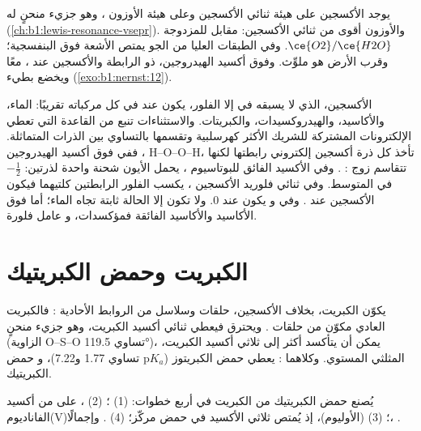 يوجد الأكسجين على هيئة ثنائي الأكسجين  وعلى هيئة الأوزون ، وهو جزيء منحنٍ
له  (\cref{ch:b1:lewis-resonance-vsepr}). والأوزون
 أقوى من ثنائي الأكسجين: 
مقابل  للمزدوجة $\ce{O2}/\ce{H2O}$. وفي الطبقات العليا من الجو يمتص
الأشعة فوق البنفسجية؛ وقرب الأرض هو ملوِّث. وفوق أكسيد الهيدروجين،
ذو الرابطة  والأكسجين عند ،   معًا
ويخضع  بطيء (\cref{exo:b1:nernst:12}).

\begin{example}
الأكسجين، الذي لا يسبقه في  إلا الفلور، يكون عند  في
كل مركباته تقريبًا: الماء، والأكاسيد، والهيدروكسيدات، والكبريتات.
والاستثناءات تنبع من القاعدة التي تعطي الإلكترونات المشتركة للشريك الأكثر
كهرسلبية وتقسمها بالتساوي بين الذرات المتماثلة. ففي
فوق أكسيد الهيدروجين ، H--O--O--H، تأخذ كل ذرة أكسجين إلكتروني
رابطتها  لكنها تتقاسم زوج : . وفي الأكسيد
الفائق للبوتاسيوم ، يحمل الأيون  شحنة واحدة لذرتين:
$-\frac12$ في المتوسط. وفي ثنائي فلوريد الأكسجين ، يكسب الفلور
الرابطتين كلتيهما فيكون الأكسجين عند . وفي  و يكون عند 0. ولا تكون
إلا الحالة  ثابتة تجاه الماء؛ أما فوق الأكاسيد والأكاسيد الفائقة فمؤكسدات،
و عامل فلورة.
\end{example}

\section{الكبريت وحمض الكبريتيك}

يكوّن الكبريت، بخلاف الأكسجين، حلقات وسلاسل من الروابط الأحادية :
فالكبريت العادي مكوّن من حلقات . ويحترق فيعطي ثنائي أكسيد الكبريت، وهو
جزيء منحنٍ (الزاوية O--S--O تساوي \ang{119.5})، يمكن أن يتأكسد أكثر
إلى ثلاثي أكسيد الكبريت، المثلثي المستوي. وكلاهما : 
يعطي حمض الكبريتوز ($\mathrm{p}K_a$ تساوي 1.77 و7.22)، و حمض
الكبريتيك.

\begin{proposition}\label{prop:b1:p-block-16-18:contact-steps}
يُصنع حمض الكبريتيك من الكبريت في أربع خطوات:
(1) ؛ (2) ، على  من أكسيد
الفاناديوم(V)؛ (3)  (الأوليوم)، إذ يُمتص ثلاثي
الأكسيد في حمض مركّز؛ (4) . وإجمالًا،
.
\end{proposition}

